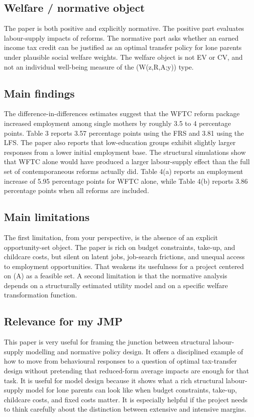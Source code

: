 \documentclass[11pt,a4paper]{article}
\begin{document}
\subsection*{Welfare / normative object}
The paper is both positive and explicitly normative. The positive part evaluates labour-supply impacts of reforms. The normative part asks whether an earned income tax credit can be justified as an optimal transfer policy for lone parents under plausible social welfare weights. The welfare object is not EV or CV, and not an individual well-being measure of the (W(z,R,A;y)) type.

\subsection*{Main findings}
The difference-in-differences estimates suggest that the WFTC reform package increased employment among single mothers by roughly 3.5 to 4 percentage points. Table 3 reports 3.57 percentage points using the FRS and 3.81 using the LFS. The paper also reports that low-education groups exhibit slightly larger responses from a lower initial employment base. The structural simulations show that WFTC alone would have produced a larger labour-supply effect than the full set of contemporaneous reforms actually did. Table 4(a) reports an employment increase of 5.95 percentage points for WFTC alone, while Table 4(b) reports 3.86 percentage points when all reforms are included.

\subsection*{Main limitations}
The first limitation, from your perspective, is the absence of an explicit opportunity-set object. The paper is rich on budget constraints, take-up, and childcare costs, but silent on latent jobs, job-search frictions, and unequal access to employment opportunities. That weakens its usefulness for a project centered on (A) as a feasible set. A second limitation is that the normative analysis depends on a structurally estimated utility model and on a specific welfare transformation function.

\subsection*{Relevance for my JMP}
This paper is very useful for framing the junction between structural labour-supply modelling and normative policy design. It offers a disciplined example of how to move from behavioural responses to a question of optimal tax-transfer design without pretending that reduced-form average impacts are enough for that task. It is useful for model design because it shows what a rich structural labour-supply model for lone parents can look like when budget constraints, take-up, childcare costs, and fixed costs matter. It is especially helpful if the project needs to think carefully about the distinction between extensive and intensive margins.
\end{document}
